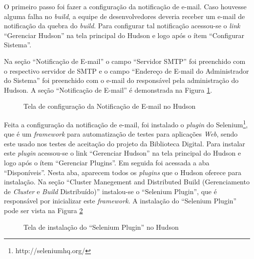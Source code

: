 O primeiro passo foi fazer a configuração da notificação de e-mail. Caso houvesse alguma falha no \textit{build}, a equipe de desenvolvedores deveria receber um e-mail de notificação da quebra do \textit{build}. Para configurar tal notificação acessou-se o \textit{link} ``Gerenciar Hudson'' na tela principal do Hudson e logo após o ítem ``Configurar Sistema''.

Na seção ``Notificação de E-mail'' o campo ``Servidor SMTP'' foi preenchido com o respectivo servidor de SMTP e o campo ``Endereço de E-mail do Administrador do Sistema'' foi preenchido com o e-mail do responsável pela administração do Hudson. A seção ``Notificação de E-mail'' é demonstrada na Figura \ref{notificacao_email}.

\begin{figure}[ht]
    \centering
    \caption{Tela de configuração da Notificação de E-mail no Hudson}
    \label{notificacao_email}
\end{figure}

Feita a configuração da notificação de e-mail, foi instalado o \textit{plugin} do Selenium\footnote{http://seleniumhq.org/}, que é um \textit{framework} para automatização de testes para aplicações \textit{Web}, sendo este usado nos testes de aceitação do projeto da Biblioteca Digital. Para instalar este \textit{plugin} acessou-se o link ``Gerenciar Hudson'' na tela principal do Hudson e logo após o ítem ``Gerenciar Plugins''. Em seguida foi acessada a aba ``Disponíveis''. Nesta aba, aparecem todos os \textit{plugins} que o Hudson oferece para instalação. Na seção ``Cluster Manegement and Distributed Build (Gerenciamento de \textit{Cluster} e \textit{Build} Distribuído)'' instalou-se o ``Selenium Plugin'', que é responsável por inicializar este \textit{framework}. A instalação do ``Selenium Plugin'' pode ser vista na Figura \ref{selenium_plugin}

\begin{figure}[ht]
    \centering
    \caption{Tela de instalação do ``Selenium Plugin'' no Hudson}
    \label{selenium_plugin}
\end{figure}

